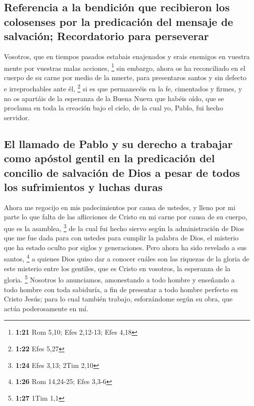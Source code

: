 \begin{paracol}{2}
\hypertarget{referencia-a-la-bendiciuxf3n-que-recibieron-los-colosenses-por-la-predicaciuxf3n-del-mensaje-de-salvaciuxf3n-recordatorio-para-perseverar}{%
\subsection{Referencia a la bendición que recibieron los colosenses por
la predicación del mensaje de salvación; Recordatorio para
perseverar}\label{referencia-a-la-bendiciuxf3n-que-recibieron-los-colosenses-por-la-predicaciuxf3n-del-mensaje-de-salvaciuxf3n-recordatorio-para-perseverar}}

 Vosotros, que en tiempos pasados estabais enajenados y
erais enemigos en vuestra mente por vuestras malas acciones, \footnote{\textbf{1:21}
  Rom 5,10; Efes 2,12-13; Efes 4,18}  sin embargo, ahora
os ha reconciliado en el cuerpo de su carne por medio de la muerte, para
presentaros santos y sin defecto e irreprochables ante él, \footnote{\textbf{1:22}
  Efes 5,27}  si es que permanecéis en la fe, cimentados
y firmes, y no os apartáis de la esperanza de la Buena Nueva que habéis
oído, que se proclama en toda la creación bajo el cielo, de la cual yo,
Pablo, fui hecho servidor.

\hypertarget{el-llamado-de-pablo-y-su-derecho-a-trabajar-como-apuxf3stol-gentil-en-la-predicaciuxf3n-del-concilio-de-salvaciuxf3n-de-dios-a-pesar-de-todos-los-sufrimientos-y-luchas-duras}{%
\subsection{El llamado de Pablo y su derecho a trabajar como apóstol
gentil en la predicación del concilio de salvación de Dios a pesar de
todos los sufrimientos y luchas
duras}\label{el-llamado-de-pablo-y-su-derecho-a-trabajar-como-apuxf3stol-gentil-en-la-predicaciuxf3n-del-concilio-de-salvaciuxf3n-de-dios-a-pesar-de-todos-los-sufrimientos-y-luchas-duras}}

 Ahora me regocijo en mis padecimientos por causa de
ustedes, y lleno por mi parte lo que falta de las aflicciones de Cristo
en mi carne por causa de su cuerpo, que es la asamblea, \footnote{\textbf{1:24}
  Efes 3,13; 2Tim 2,10}  de la cual fui hecho siervo
según la administración de Dios que me fue dada para con ustedes para
cumplir la palabra de Dios,  el misterio que ha estado
oculto por siglos y generaciones. Pero ahora ha sido revelado a sus
santos, \footnote{\textbf{1:26} Rom 14,24-25; Efes 3,3-6}
 a quienes Dios quiso dar a conocer cuáles son las
riquezas de la gloria de este misterio entre los gentiles, que es Cristo
en vosotros, la esperanza de la gloria. \footnote{\textbf{1:27} 1Tim 1,1}
 Nosotros lo anunciamos, amonestando a todo hombre y
enseñando a todo hombre con toda sabiduría, a fin de presentar a todo
hombre perfecto en Cristo Jesús;  para lo cual también
trabajo, esforzándome según su obra, que actúa poderosamente en mí.


\end{paracol}
